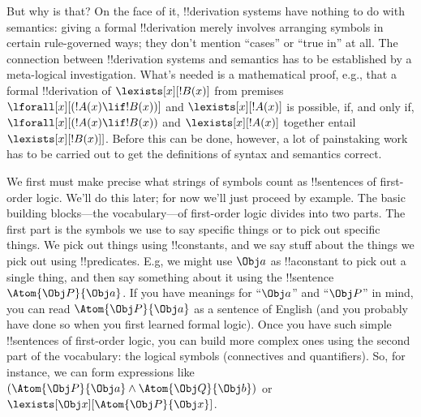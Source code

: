 But why is that?  On the face of it, !!{derivation} systems have nothing to do
with semantics: giving a formal !!{derivation} merely involves arranging symbols
in certain rule-governed ways; they don't mention ``cases'' or ``true
in'' at all.  The connection between !!{derivation} systems and semantics has
to be established by a meta-logical investigation. What's needed is a
mathematical proof, e.g., that a formal !!{derivation} of $\lexists[x][!B(x)]$
from premises $\lforall[x][(!A(x) \lif !B(x))]$ and
$\lexists[x][!A(x)]$ is possible, if, and only if, $\lforall[x][(!A(x)
\lif !B(x))$ and $\lexists[x][!A(x)]$ together
entail~$\lexists[x][!B(x)]]$.  Before this can be done, however, a
lot of painstaking work has to be carried out to get the definitions
of syntax and semantics correct.







We first must make precise what strings of symbols count as
!!{sentence}s of first-order logic.  We'll do this later; for now
we'll just proceed by example.  The basic building blocks---the
vocabulary---of first-order logic divides into two parts. The first
part is the symbols we use to say specific things or to pick out
specific things. We pick out things using !!{constant}s, and we say
stuff about the things we pick out using !!{predicate}s.  E.g, we
might use $\Obj a$ as !!a{constant} to pick out a single thing, and
then say something about it using the !!{sentence}~$\Atom{\Obj P}{\Obj
a}$.  If you have meanings for ``$\Obj a$'' and ``$\Obj P$'' in mind,
you can read $\Atom{\Obj P}{\Obj a}$ as a sentence of English (and you
probably have done so when you first learned formal logic).  Once you
have such simple !!{sentence}s of first-order logic, you can build
more complex ones using the second part of the vocabulary: the logical
symbols (connectives and quantifiers). So, for instance, we can form
expressions like $(\Atom{\Obj P}{\Obj a} \land \Atom{\Obj Q}{\Obj b})$
or~$\lexists[\Obj x][\Atom{\Obj P}{\Obj x}]$.

